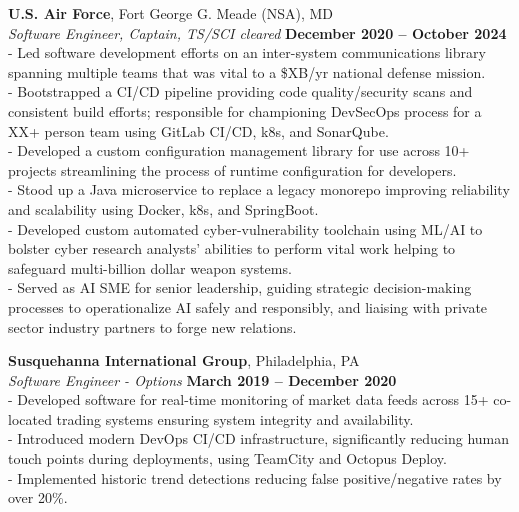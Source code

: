 \documentclass[margin,line]{resume}
\begin{document}
\begin{resume}
    \textbf{U.S. Air Force}, Fort George G. Meade (NSA), MD \vspace{2mm}\\\vspace{1mm}%
    \textsl{Software Engineer, Captain, TS/SCI cleared} \hfill \textbf{December 2020 -- October 2024}\\
    - Led software development efforts on an inter-system communications library spanning multiple teams that was vital to a \$XB/yr national defense mission.\vspace{1mm}\\%
    - Bootstrapped a CI/CD pipeline providing code quality/security scans and consistent build efforts; responsible for championing DevSecOps process for a XX+ person team using GitLab CI/CD, k8s, and SonarQube.\vspace{1mm}\\%
    - Developed a custom configuration management library for use across 10+ projects streamlining the process of runtime configuration for developers.\vspace{1mm}\\%
    - Stood up a Java microservice to replace a legacy monorepo improving reliability and scalability using Docker, k8s, and SpringBoot.\vspace{1mm}\\%
    - Developed custom automated cyber-vulnerability toolchain using ML/AI to bolster cyber research analysts' abilities to perform vital work helping to safeguard multi-billion dollar weapon systems.\vspace{1mm}\\%
    - Served as AI SME for senior leadership, guiding strategic decision-making processes to operationalize AI safely and responsibly, and liaising with private sector industry partners to forge new relations.

    \textbf{Susquehanna International Group}, Philadelphia, PA \vspace{2mm}\\\vspace{1mm}%
    \textsl{Software Engineer - Options} \hfill \textbf{March 2019 -- December 2020}\\
    - Developed software for real-time monitoring of market data feeds across 15+ co-located trading systems ensuring system integrity and availability.\vspace{1mm}\\%
    - Introduced modern DevOps CI/CD infrastructure, significantly reducing human touch points during deployments, using TeamCity and Octopus Deploy.\vspace{1mm}\\%
    - Implemented historic trend detections reducing false positive/negative rates by over 20\%.


\end{resume}
\end{document}
